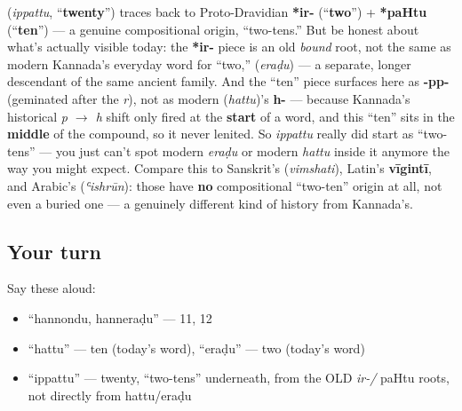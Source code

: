 \begin{cousinweb}
\textbf{} (\emph{ippattu}, \textquotedblleft{}\textbf{twenty}\textquotedblright{}) traces back to Proto-Dravidian \textbf{*ir-} (\textquotedblleft{}\textbf{two}\textquotedblright{}) + \textbf{*paHtu} (\textquotedblleft{}\textbf{ten}\textquotedblright{}) — a genuine compositional origin, \textquotedblleft{}two-tens.\textquotedblright{} But be honest about what's actually visible today: the \textbf{*ir-} piece is an old \emph{bound} root, not the same as modern Kannada's everyday word for \textquotedblleft{}two,\textquotedblright{} \textbf{} (\emph{eraḍu}) — a separate, longer descendant of the same ancient family. And the \textquotedblleft{}ten\textquotedblright{} piece surfaces here as \textbf{-pp-} (geminated after the \emph{r}), not as modern \textbf{} (\emph{hattu})'s \textbf{h-} — because Kannada's historical \emph{p $\to$ h} shift only fired at the \textbf{start} of a word, and this \textquotedblleft{}ten\textquotedblright{} sits in the \textbf{middle} of the compound, so it never lenited. So \emph{ippattu} really did start as \textquotedblleft{}two-tens\textquotedblright{} — you just can't spot modern \emph{eraḍu} or modern \emph{hattu} inside it anymore the way you might expect. Compare this to Sanskrit's \textbf{} (\emph{vimshati}), Latin's \textbf{vīgintī}, and Arabic's \textbf{} (\emph{ʿishrūn}): those have \textbf{no} compositional \textquotedblleft{}two-ten\textquotedblright{} origin at all, not even a buried one — a genuinely different kind of history from Kannada's.
\end{cousinweb}

\subsection*{Your turn}
Say these aloud:

\begin{itemize}
\raggedright
  \item \textquotedblleft{}hannondu, hanneraḍu\textquotedblright{} — 11, 12
  \item \textquotedblleft{}hattu\textquotedblright{} — ten (today's word), \textquotedblleft{}eraḍu\textquotedblright{} — two (today's word)
  \item \textquotedblleft{}ippattu\textquotedblright{} — twenty, \textquotedblleft{}two-tens\textquotedblright{} underneath, from the OLD \emph{ir-/ }paHtu roots, not directly from hattu/eraḍu
\end{itemize}

